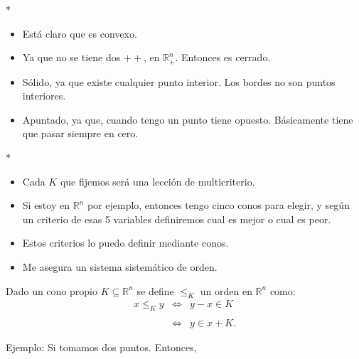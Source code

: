 \begin{paracol}{2}
\switchcolumn[1]*{\noindent\scriptsize
    \begin{itemize}
	\item Está claro que es convexo.
	\item Ya que no se tiene dos $++$, en $\mathbb{R}^n_+$. Entonces es cerrado.
	\item Sólido, ya que existe cualquier punto interior. Los bordes no son puntos interiores.
	\item Apuntado, ya que, cuando tengo un punto tiene opuesto. Básicamente tiene que pasar siempre en cero.
    \end{itemize}
}
\switchcolumn[0]\noindent
\begin{center}
\end{center}


\switchcolumn[1]*{\noindent\scriptsize
    \begin{itemize}
	\item Cada $K$ que fijemos será una lección de multicriterio.
	\item Si estoy en $\mathbb{R}^n$ por ejemplo, entonces tengo cinco conos para elegir, y según un criterio de esas 5 variables definiremos cual es mejor o cual es peor. 
	\item Estos criterios lo puedo definir mediante conos.
	\item Me asegura un sistema sistemático de orden.
    \end{itemize}
}
\switchcolumn[0]\noindent
Dado un cono propio $K\subseteq \mathbb{R}^n$ se define $\leq_K$ un orden en $\mathbb{R}^n$ como:
$$
\begin{array}{rlc}
    x\leq_K y &\Leftrightarrow& y-x\in K\\\\
	      &\Leftrightarrow& y\in x+K.
\end{array}
$$

Ejemplo: Si tomamos  dos puntos. Entonces,
\begin{center}
\end{center}
\end{paracol}
